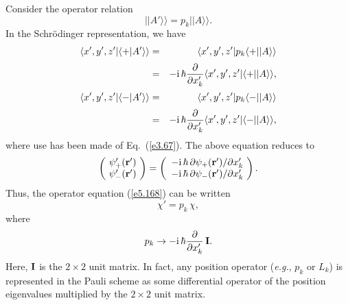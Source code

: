 Consider the operator relation
\begin{equation}\label{e5.168}
||A'\rangle\rangle = p_k ||A\rangle\rangle.
\end{equation}
In the Schr\"{o}dinger representation, we have
\begin{eqnarray}
\langle x', y', z'|\langle + |A'\rangle\rangle& =&
\langle x', y', z'|p_k \langle +||A\rangle\rangle \nonumber\\[0.5ex]
&=& -{\rm i}\,\hbar\frac{\partial}
{\partial x_k'} \langle x', y', z'| \langle +||A\rangle\rangle,\\[0.5ex]
\langle x', y', z'|\langle - |A'\rangle\rangle& =&
\langle x', y', z'|p_k \langle -||A\rangle\rangle\nonumber\\[0.5ex]
& =& -{\rm i}\,\hbar\frac{\partial}
{\partial x_k'} \langle x', y', z'| \langle -||A\rangle\rangle,
\end{eqnarray}
where use has been made of Eq.~(\ref{e3.67}). The above equation reduces to
\begin{equation}
\left(\! \begin{array}{c} \psi_+'({\bf r}')\\
\psi_-' ({\bf r}') \end{array}\!\right) = 
\left(\begin{array}{c} -{\rm i}\,\hbar \,\partial \psi_+({\bf r}') /\partial x_k'\\
 -{\rm i}\,\hbar \,\partial \psi_-({\bf r}')/\partial x_k'\end{array}\!\right).
\end{equation}
Thus, the operator equation (\ref{e5.168})
can be written
\begin{equation}
\chi' = p_k\, \chi,
\end{equation}
where 
\begin{equation}\label{e5.172}
p_k \rightarrow -{\rm i}\,\hbar\frac{\partial}{\partial x_k'}\, {\bf I}.
\end{equation}
Here, ${\bf I}$ is the $2\times 2$ unit matrix. In fact, any position operator
({\em e.g.}, $p_k$ or $L_k$) is represented in the Pauli scheme as some differential
operator of the position eigenvalues multiplied by the $2\times2$ unit matrix. 

